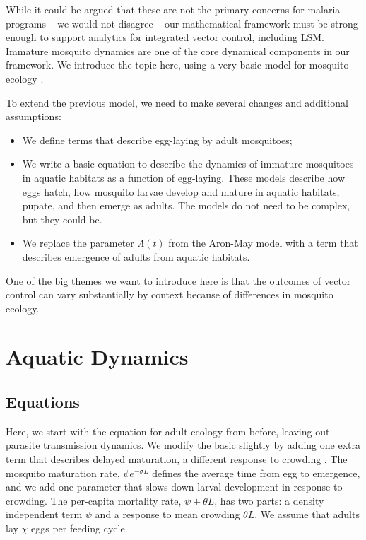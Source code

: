 \documentclass[
]{book}
\begin{document}
While it could be argued that these are not the primary concerns for malaria programs -- we would not disagree -- our mathematical framework must be strong enough to support analytics for integrated vector control, including LSM. Immature mosquito dynamics are one of the core dynamical components in our framework. We introduce the topic here, using a very basic model for mosquito ecology \autocite{SmithDL2013LarvalDynamics}.

To extend the previous model, we need to make several changes and additional assumptions:

\begin{itemize}
\item
  We define terms that describe egg-laying by adult mosquitoes;
\item
  We write a basic equation to describe the dynamics of immature mosquitoes in aquatic habitats as a function of egg-laying. These models describe how eggs hatch, how mosquito larvae develop and mature in aquatic habitats, pupate, and then emerge as adults. The models do not need to be complex, but they could be.
\item
  We replace the parameter \(\Lambda(t)\) from the Aron-May model with a term that
  describes emergence of adults from aquatic habitats.
\end{itemize}

One of the big themes we want to introduce here is that the outcomes of vector control can vary substantially by context because of differences in mosquito ecology.

\section{Aquatic Dynamics}\label{aquatic-dynamics}

\subsection{Equations}\label{equations-3}

Here, we start with the equation for adult ecology from before, leaving out parasite transmission dynamics. We modify the basic slightly by adding one extra term that describes delayed maturation, a different response to crowding \autocite{SmithDL2013LarvalDynamics}. The mosquito maturation rate, \(\psi e^{-\sigma L}\) defines the average time from egg to emergence, and we add one parameter that slows down larval development in response to crowding. The per-capita mortality rate, \(\psi  + \theta L\), has two parts: a density independent term \(\psi\) and a response to mean crowding \(\theta L\). We assume that adults lay \(\chi\) eggs per feeding cycle.
\end{document}

